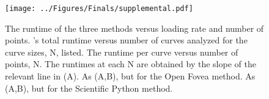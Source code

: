 \begin{figure}
\caption[Algorithmic runtime versus loading rate]{\noindent{}\pStartF The runtime of the three methods versus loading rate and number of points.  \name{}'s total runtime versus number of curves analyzed for the curve sizes, N, listed.  The runtime per curve versus number of points, N. The runtimes at each N are obtained by the slope of the relevant line in (A).   As (A,B), but for the Open Fovea method.  As (A,B), but for the Scientific Python method. \pEndF }
\centering
\texttt{[image: ../Figures/Finals/supplemental.pdf]}%
\end{figure}





%

%

%
